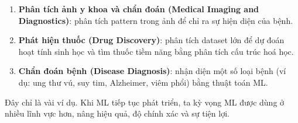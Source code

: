 \begin{phuongphap}[title={Một số ứng dụng}]
\begin{enumerate}
  \item \textbf{Phân tích ảnh y khoa và chẩn đoán (Medical Imaging and Diagnostics)}: phân tích pattern trong ảnh để chỉ ra sự hiện diện của bệnh.
  \item \textbf{Phát hiện thuốc (Drug Discovery)}: phân tích dataset lớn để dự đoán hoạt tính sinh học và tìm thuốc tiềm năng bằng phân tích cấu trúc hoá học.
  \item \textbf{Chẩn đoán bệnh (Disease Diagnosis)}: nhận diện một số loại bệnh (ví dụ: ung thư vú, suy tim, Alzheimer, viêm phổi) bằng thuật toán ML.
\end{enumerate}
\end{phuongphap}

\begin{luuy}[title={Kết luận}]
Đây chỉ là vài ví dụ. Khi ML tiếp tục phát triển, ta kỳ vọng ML được dùng ở nhiều lĩnh vực hơn, nâng hiệu quả, độ chính xác và sự tiện lợi.
\end{luuy}